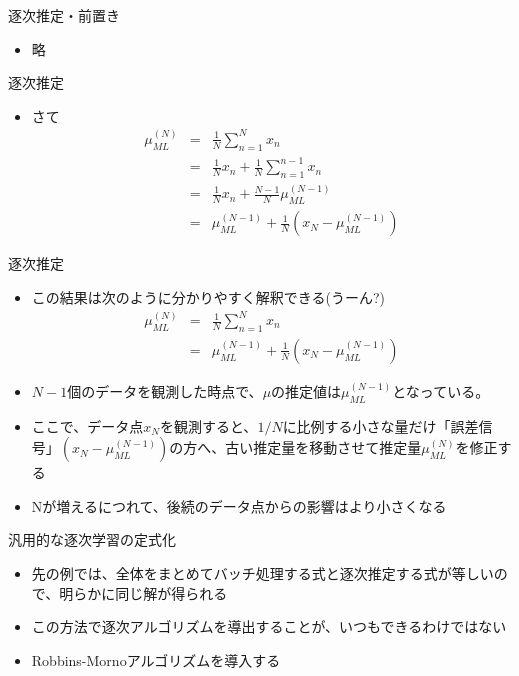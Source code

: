 \begin{frame}{逐次推定・前置き}
 \begin{itemize}
	\item 略
 \end{itemize}
\end{frame}

\begin{frame}{逐次推定}
 \begin{itemize}
	\item さて
				\begin{eqnarray}
				 \mu_{ML}^{(N)} &= &\frac{1}{N}\sum_{n=1}^{N}x_n \\
				 & =& \frac{1}{N}x_n+\frac{1}{N}\sum_{n=1}^{n-1}x_n \\
				 & =& \frac{1}{N}x_n + \frac{N-1}{N}\mu_{ML}^{(N-1)}\\
				 & =& \mu_{ML}^{(N-1)} +\frac{1}{N} (x_N-\mu_{ML}^{(N-1)})
				\end{eqnarray}
 \end{itemize}
\end{frame}

\begin{frame}{逐次推定}
 \begin{itemize}
	\item この結果は次のように分かりやすく解釈できる(うーん?)
				\begin{eqnarray}
				 \mu_{ML}^{(N)} &= &\frac{1}{N}\sum_{n=1}^{N}x_n \\
				 & =& \mu_{ML}^{(N-1)} +\frac{1}{N} (x_N-\mu_{ML}^{(N-1)})
				\end{eqnarray}
	\item $N-1$個のデータを観測した時点で、$\mu$の推定値は$\mu_{ML}^{(N-1)}$となっている。
	\item ここで、データ点$x_N$を観測すると、$1/N$に比例する小さな量だけ「誤差信号」$(x_N-\mu_{ML}^{(N-1)})$の方へ、古い推定量を移動させて推定量$\mu_{ML}^{(N)}$を修正する
	\item Nが増えるにつれて、後続のデータ点からの影響はより小さくなる
 \end{itemize}
\end{frame}

\begin{frame}{汎用的な逐次学習の定式化}
 \begin{itemize}
	\item 先の例では、全体をまとめてバッチ処理する式と逐次推定する式が等しいので、明らかに同じ解が得られる
	\item この方法で逐次アルゴリズムを導出することが、いつもできるわけではない
	\item Robbins-Mornoアルゴリズムを導入する
 \end{itemize}
\end{frame}


